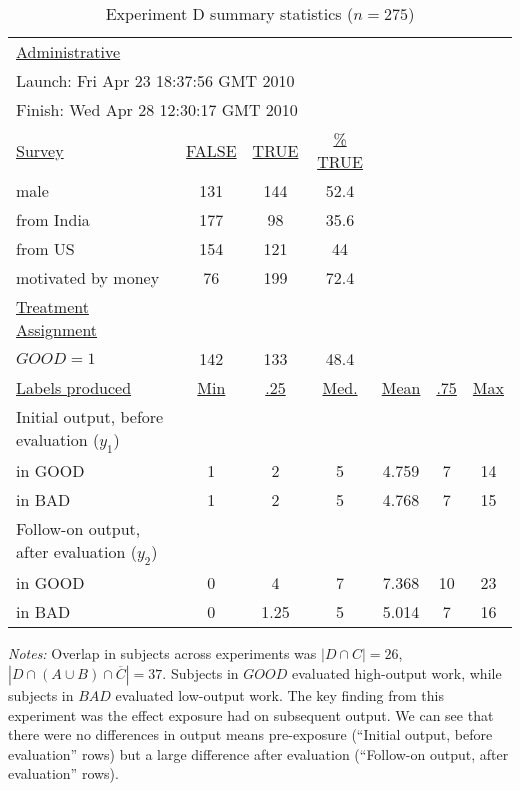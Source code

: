 \documentclass[12pt]{article}
\begin{document}
\begin{table}[h!]
  \begin{center}  
   \caption{Experiment D summary statistics ($n=275$)\label{tab:ExpD.ss}}
\begin{tabular}{lcccccc}
 \toprule 
 \underline{Administrative} \\
  \multicolumn{4}{l}{\hspace{10pt} Launch:  Fri Apr 23 18:37:56 GMT 2010} \\
  \multicolumn{4}{l}{\hspace{10pt} Finish:  Wed Apr 28 12:30:17 GMT 2010} \\[5pt]   
  \underline{Survey}    & \underline{FALSE} & \underline{TRUE} & \underline{\% TRUE}   \\
  \hspace{10pt} male                  & 131 & 144 & 52.4  \\
  \hspace{10pt} from India                 & 177 & 98 & 35.6  \\
  \hspace{10pt} from US                    & 154 & 121 & 44  \\
  \hspace{10pt} motivated by money                 & 76 & 199 & 72.4  \\[5pt]
  \underline{Treatment Assignment} \\ 
  \hspace{10pt} $GOOD=1$                & 142 & 133 & 48.4  \\[5pt]
  
  \underline{Labels produced} &  \underline{Min} & \underline{.25} & \underline{Med.} & \underline{Mean} & \underline{.75} & \underline{Max}\\ 
  Initial output, before evaluation ($y_1$) \\
  \hspace{10pt} in GOOD     & 1 & 2 & 5 & 4.759 & 7 & 14  \\
  \hspace{10pt} in BAD      & 1 & 2 & 5 & 4.768 & 7 & 15  \\
  Follow-on output, after evaluation ($y_2$) \\
  \hspace{10pt} in GOOD           & 0 & 4 & 7 & 7.368 & 10 & 23\\
  \hspace{10pt} in BAD            & 0 & 1.25 & 5 & 5.014 & 7 & 16\\
  
  \bottomrule 
  \end{tabular}
\end{center} 
\emph{Notes:} Overlap in subjects across experiments was $|D \cap
C|=26$, $|D \cap (A \cup B) \cap \overline{C}|=37$. Subjects in $GOOD$
evaluated high-output work, while subjects in $BAD$ evaluated
low-output work. The key finding from this experiment was the effect
exposure had on subsequent output. We can see that there were no
differences in output means pre-exposure (``Initial output, before
evaluation'' rows) but a large difference after evaluation
(``Follow-on output, after evaluation'' rows).
\end{table} 
\end{document}
